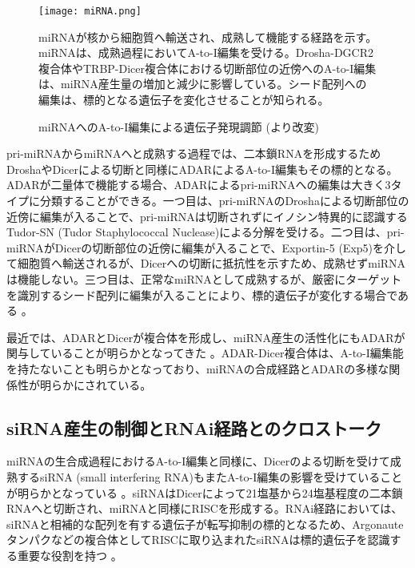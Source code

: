 \begin{figure}[!h]
	\begin{center}
		\texttt{[image: miRNA.png]}
	\end{center}
	\caption{miRNAへのA-to-I編集による遺伝子発現調節 (\cite{Nishikura:2006aa}より改変)}
	\begin{flushleft}
		\small{miRNAが核から細胞質へ輸送され、成熟して機能する経路を示す。miRNAは、成熟過程においてA-to-I編集を受ける。Drosha-DGCR2複合体やTRBP-Dicer複合体における切断部位の近傍へのA-to-I編集は、miRNA産生量の増加と減少に影響している。シード配列への編集は、標的となる遺伝子を変化させることが知られる。}
	\end{flushleft}
	\label{fig:miRNA}
\end{figure}
pri-miRNAからmiRNAへと成熟する過程では、二本鎖RNAを形成するためDroshaやDicerによる切断と同様にADARによるA-to-I編集もその標的となる。ADARが二量体で機能する場合、ADARによるpri-miRNAへの編集は大きく3タイプに分類することができる。一つ目は、pri-miRNAのDroshaによる切断部位の近傍に編集が入ることで、pri-miRNAは切断されずにイノシン特異的に認識するTudor-SN (Tudor Staphylococcal
Nuclease)による分解を受ける。二つ目は、pri-miRNAがDicerの切断部位の近傍に編集が入ることで、Exportin-5 (Exp5)を介して細胞質へ輸送されるが、Dicerへの切断に抵抗性を示すため、成熟せずmiRNAは機能しない。三つ目は、正常なmiRNAとして成熟するが、厳密にターゲットを識別するシード配列に編集が入ることにより、標的遺伝子が変化する場合である \citep{Slotkin:2013aa}。
\par
最近では、ADARとDicerが複合体を形成し、miRNA産生の活性化にもADARが関与していることが明らかとなってきた \citep{OtaSakGup1304}。ADAR-Dicer複合体は、A-to-I編集能を持たないことも明らかとなっており、miRNAの合成経路とADARの多様な関係性が明らかにされている。

\subsection{siRNA産生の制御とRNAi経路とのクロストーク}
miRNAの生合成過程におけるA-to-I編集と同様に、Dicerのよる切断を受けて成熟するsiRNA (small interfering RNA)もまたA-to-I編集の影響を受けていることが明らかとなっている \citep{YanWanHow0502}。siRNAはDicerによって21塩基から24塩基程度の二本鎖RNAへと切断され、miRNAと同様にRISCを形成する。RNAi経路においては、siRNAと相補的な配列を有する遺伝子が転写抑制の標的となるため、Argonauteタンパクなどの複合体としてRISCに取り込まれたsiRNAは標的遺伝子を認識する重要な役割を持つ \citep{Fil0507}。

